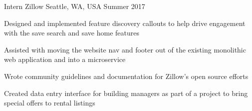 \begin{cventries}
\cventry
{Intern}
{Zillow}
{Seattle, WA, USA}
{Summer 2017}
{
\begin{cvitems}
\item Designed and implemented feature discovery callouts to help drive engagement with the save search and save home features
\item Assisted with moving the website nav and footer out of the existing monolithic web application and into a microservice
\item Wrote community guidelines and documentation for Zillow's open source efforts
\item Created data entry interface for building managers as part of a project to bring special offers to rental listings
\end{cvitems}
}

\end{cventries}
